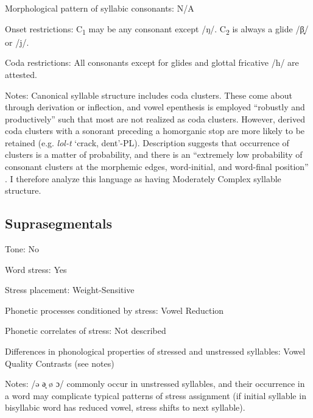 {\begin{appendixdesc}
\item[Morphological pattern of syllabic consonants:] N/A

\item[Onset restrictions:] C\textsubscript{1} may be any consonant except /ŋ/. C\textsubscript{2} is always a glide /β̞/ or /j/.

\item[Coda restrictions:] All consonants except for glides and glottal fricative /h/ are attested. 

\item[Notes:] Canonical syllable structure includes coda clusters. These come about through derivation or inflection, and vowel epenthesis is employed “robustly and productively” such that most are not realized as coda clusters. However, derived coda clusters with a sonorant preceding a homorganic stop are more likely to be retained (e.g. \textit{lol-t} ‘crack, dent’-PL). Description suggests that occurrence of clusters is a matter of probability, and there is an “extremely low probability of consonant clusters at the morphemic edges, word-initial, and word-final position” \citep[55]{Filchenko2007}. I therefore analyze this language as having Moderately Complex syllable structure.
\end{appendixdesc}
\subsection*{Suprasegmentals}
\begin{appendixdesc}
\item[Tone:] No

\item[Word stress:] Yes

\item[Stress placement:] Weight-Sensitive

\item[Phonetic processes conditioned by stress:] Vowel Reduction

\item[Phonetic correlates of stress:] Not described

\item[Differences in phonological properties of stressed and unstressed syllables:] Vowel Quality Contrasts (see notes)

\item[Notes:] /ə ə̘ ø ɔ/ commonly occur in unstressed syllables, and their occurrence in a word may complicate typical patterns of stress assignment (if initial syllable in bisyllabic word has reduced vowel, stress shifts to next syllable).
\end{appendixdesc}
}
